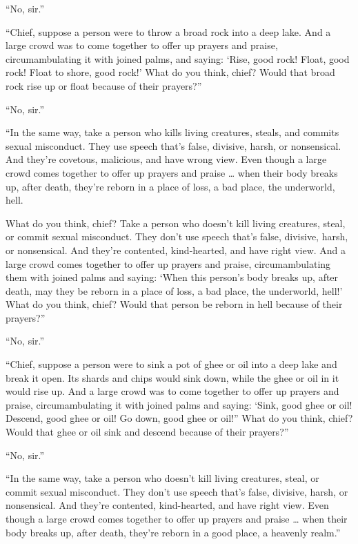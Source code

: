 \documentclass[12pt,openany]{book}%
\begin{document}
“No, sir.” 

“Chief, suppose a person were to throw a broad rock into a deep lake. And a large crowd was to come together to offer up prayers and praise, circumambulating it with joined palms, and saying: ‘Rise, good rock! Float, good rock! Float to shore, good rock!’ What do you think, chief? Would that broad rock rise up or float because of their prayers?” 

“No, sir.” 

“In the same way, take a person who kills living creatures, steals, and commits sexual misconduct. They use speech that’s false, divisive, harsh, or nonsensical. And they’re covetous, malicious, and have wrong view. Even though a large crowd comes together to offer up prayers and praise … when their body breaks up, after death, they’re reborn in a place of loss, a bad place, the underworld, hell. 

What do you think, chief? Take a person who doesn’t kill living creatures, steal, or commit sexual misconduct. They don’t use speech that’s false, divisive, harsh, or nonsensical. And they’re contented, kind-hearted, and have right view. And a large crowd comes together to offer up prayers and praise, circumambulating them with joined palms and saying: ‘When this person’s body breaks up, after death, may they be reborn in a place of loss, a bad place, the underworld, hell!’ What do you think, chief? Would that person be reborn in hell because of their prayers?” 

“No, sir.” 

“Chief, suppose a person were to sink a pot of ghee or oil into a deep lake and break it open. Its shards and chips would sink down, while the ghee or oil in it would rise up. And a large crowd was to come together to offer up prayers and praise, circumambulating it with joined palms and saying: ‘Sink, good ghee or oil! Descend, good ghee or oil! Go down, good ghee or oil!” What do you think, chief? Would that ghee or oil sink and descend because of their prayers?” 

“No, sir.” 

“In the same way, take a person who doesn’t kill living creatures, steal, or commit sexual misconduct. They don’t use speech that’s false, divisive, harsh, or nonsensical. And they’re contented, kind-hearted, and have right view. Even though a large crowd comes together to offer up prayers and praise … when their body breaks up, after death, they’re reborn in a good place, a heavenly realm.” 
\end{document}
